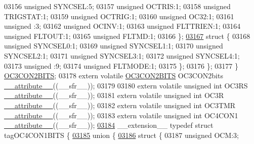 \begin{DoxyCode}
03156       \textcolor{keywordtype}{unsigned} SYNCSEL:5;
03157       \textcolor{keywordtype}{unsigned} OCTRIS:1;
03158       \textcolor{keywordtype}{unsigned} TRIGSTAT:1;
03159       \textcolor{keywordtype}{unsigned} OCTRIG:1;
03160       \textcolor{keywordtype}{unsigned} OC32:1;
03161       \textcolor{keywordtype}{unsigned} :3;
03162       \textcolor{keywordtype}{unsigned} OCINV:1;
03163       \textcolor{keywordtype}{unsigned} FLTTRIEN:1;
03164       \textcolor{keywordtype}{unsigned} FLTOUT:1;
03165       \textcolor{keywordtype}{unsigned} FLTMD:1;
03166     \};
\hypertarget{a00009_source_l03167}{}\hyperlink{a00009}{03167}     \textcolor{keyword}{struct }\{
03168       \textcolor{keywordtype}{unsigned} SYNCSEL0:1;
03169       \textcolor{keywordtype}{unsigned} SYNCSEL1:1;
03170       \textcolor{keywordtype}{unsigned} SYNCSEL2:1;
03171       \textcolor{keywordtype}{unsigned} SYNCSEL3:1;
03172       \textcolor{keywordtype}{unsigned} SYNCSEL4:1;
03173       \textcolor{keywordtype}{unsigned} :9;
03174       \textcolor{keywordtype}{unsigned} FLTMODE:1;
03175     \};
03176   \};
03177 \} \hyperlink{a00008_dc/db1/a00621}{OC3CON2BITS};
03178 \textcolor{keyword}{extern} \textcolor{keyword}{volatile} \hyperlink{a00008_dc/db1/a00621}{OC3CON2BITS} OC3CON2bits \hyperlink{a00009_a493c46f03454991ccc5aa7a6e1dfb2a7}{\_\_attribute\_\_}((\_\_sfr\_\_));
03179 
03180 \textcolor{keyword}{extern} \textcolor{keyword}{volatile} \textcolor{keywordtype}{unsigned} \textcolor{keywordtype}{int}  OC3RS \hyperlink{a00009_a493c46f03454991ccc5aa7a6e1dfb2a7}{\_\_attribute\_\_}((\_\_sfr\_\_));
03181 \textcolor{keyword}{extern} \textcolor{keyword}{volatile} \textcolor{keywordtype}{unsigned} \textcolor{keywordtype}{int}  OC3R \hyperlink{a00009_a493c46f03454991ccc5aa7a6e1dfb2a7}{\_\_attribute\_\_}((\_\_sfr\_\_));
03182 \textcolor{keyword}{extern} \textcolor{keyword}{volatile} \textcolor{keywordtype}{unsigned} \textcolor{keywordtype}{int}  OC3TMR \hyperlink{a00009_a493c46f03454991ccc5aa7a6e1dfb2a7}{\_\_attribute\_\_}((\_\_sfr\_\_));
03183 \textcolor{keyword}{extern} \textcolor{keyword}{volatile} \textcolor{keywordtype}{unsigned} \textcolor{keywordtype}{int}  OC4CON1 \hyperlink{a00009_a493c46f03454991ccc5aa7a6e1dfb2a7}{\_\_attribute\_\_}((\_\_sfr\_\_));
\hypertarget{a00009_source_l03184}{}\hyperlink{a00008}{03184} \_\_extension\_\_ \textcolor{keyword}{typedef} \textcolor{keyword}{struct }tagOC4CON1BITS \{
\hypertarget{a00009_source_l03185}{}\hyperlink{a00009}{03185}   \textcolor{keyword}{union }\{
\hypertarget{a00009_source_l03186}{}\hyperlink{a00009}{03186}     \textcolor{keyword}{struct }\{
03187       \textcolor{keywordtype}{unsigned} OCM:3;

\end{DoxyCode}
